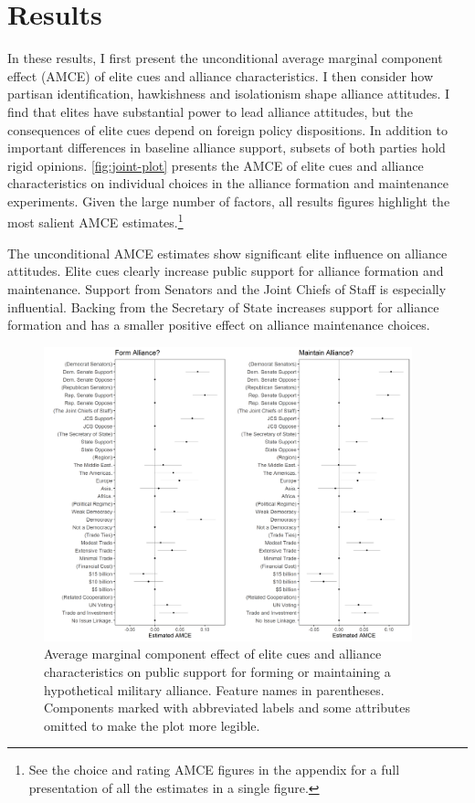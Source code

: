 \documentclass[12pt]{article}
\begin{document}
\section{Results} 


In these results, I first present the unconditional average marginal component effect (AMCE) of elite cues and alliance characteristics.
I then consider how partisan identification, hawkishness and isolationism shape alliance attitudes. 
I find that elites have substantial power to lead alliance attitudes, but the consequences of elite cues depend on foreign policy dispositions.
In addition to important differences in baseline alliance support, subsets of both parties hold rigid opinions. 
\autoref{fig:joint-plot} presents the AMCE of elite cues and alliance characteristics on individual choices in the alliance formation and maintenance experiments.
Given the large number of factors, all results figures highlight the most salient AMCE estimates.\footnote{See the choice and rating AMCE figures in the appendix for a full presentation of all the estimates in a single figure.}


The unconditional AMCE estimates show significant elite influence on alliance attitudes. 
Elite cues clearly increase public support for alliance formation and maintenance. 
Support from Senators and the Joint Chiefs of Staff is especially influential.
Backing from the Secretary of State increases support for alliance formation and has a smaller positive effect on alliance maintenance choices. 


\begin{figure}
	\centering
		\includegraphics[width=0.95\textwidth]{../figures/joint-amce-plots.png}
	\caption{Average marginal component effect of elite cues and alliance characteristics on public support for forming or maintaining a hypothetical military alliance. Feature names in parentheses. Components marked with abbreviated labels and some attributes omitted to make the plot more legible.}
	\label{fig:joint-plot}
\end{figure}
\end{document}

